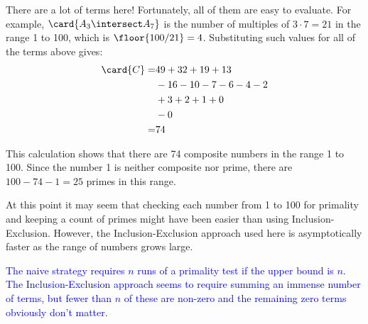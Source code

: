 \begin{editingnotes}
There are a lot of terms here!  Fortunately, all of them are easy to
evaluate.  For example, $\card{A_3 \intersect A_7}$ is the number of multiples
of $3 \cdot 7 = 21$ in the range 1 to 100, which is $\floor{100/21} = 4$.
\iffalse (Note that there is no reason to subtract 1 as we did when
evaluating $\card{A_m}$ above.)\fi Substituting such values for all of the
terms above gives:
\begin{align*}
\card{C}  = & 49 + 32 + 19 + 13 \\
            & - 16 - 10 - 7 - 6 - 4 - 2 \\
            & + 3 + 2 + 1 + 0 \\
            & - 0 \\
          = & 74
\end{align*}

This calculation shows that there are 74 composite numbers in the
range 1 to 100.  Since the number 1 is neither composite nor prime,
there are $100 - 74 - 1 = 25$ primes in this range.

At this point it may seem that checking each number from 1 to 100 for
primality and keeping a count of primes might have been easier than using
Inclusion-Exclusion.  However, the Inclusion-Exclusion approach used here
is asymptotically faster as the range of numbers grows large.

\textcolor{blue}{The naive strategy requires $n$ runs of a primality
  test if the upper bound is $n$.  The Inclusion-Exclusion approach
  seems to require summing an immense number of terms, but fewer than
  $n$ of these are non-zero and the remaining zero terms obviously
  don't matter.}
\end{editingnotes}



